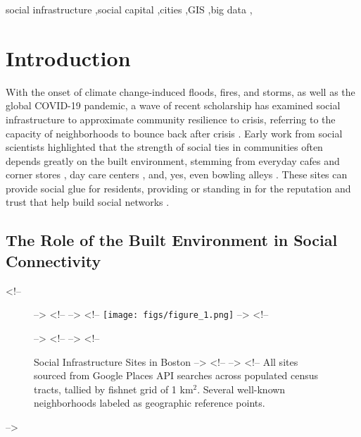 \documentclass[a4paper,fleqn]{cas-dc}
\begin{document}
\begin{keywords}
    social infrastructure \sep social capital \sep cities \sep GIS \sep big data \sep
\end{keywords}


\maketitle

\section{Introduction}


With the onset of climate change-induced floods, fires, and storms, as well as the global COVID-19 pandemic, a wave of recent scholarship has examined social infrastructure to approximate community resilience to crisis, referring to the capacity of neighborhoods to bounce back after crisis \citep{rivera_and_nickels_2014, aldrich_and_meyer_2015, aldrich_and_kiyota_2017, fraser_et_al_2021_GEC}. Early work from social scientists highlighted that the strength of social ties in communities often depends greatly on the built environment, stemming from everyday cafes and corner stores \citep{jacobs_1961}, day care centers \citep{small_2009}, and, yes, even bowling alleys \citep{putnam_2000}. These sites can provide social glue for residents, providing or standing in for the reputation and trust that help build social networks \citep{bourdieu_1986, coleman_1988, lin_2001, glanville_and_bienenstock_2009}. 

\subsection{The Role of the Built Environment in Social Connectivity}


<!-- \begin{figure}[t] -->
<!-- 	\centering -->
<!-- 		\texttt{[image: figs/figure\_1.png]} -->
<!-- 	\caption{Social Infrastructure Sites in Boston -->
<!-- 	    \newline -->
<!-- 	    All sites sourced from Google Places API searches across populated census tracts, tallied by fishnet grid of 1 km$^{2}$. Several well-known neighborhoods labeled as geographic reference points.} -->
<!-- 	\label{FIG:1} -->
<!-- \end{figure} -->

\printcredits




\end{document}
